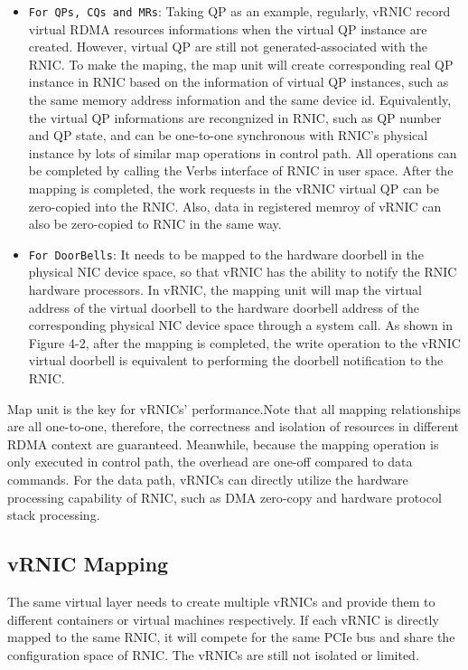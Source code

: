 \documentclass[sigplan,screen]{acmart}
\begin{document}
\begin{itemize}
\item {\verb|For QPs, CQs and MRs|}: Taking QP as an example, regularly, vRNIC record virtual RDMA resources informations when the virtual QP instance are created. However, virtual QP are still not generated-associated with the RNIC. To make the maping, the map unit will create corresponding real QP instance in RNIC based on the information of virtual QP instances, such as the same memory address information and the same device id. Equivalently, the virtual QP informations are recongnized in RNIC, such as QP number and QP state, and can be one-to-one synchronous with RNIC's  physical instance by lots of similar map operations in control path. All operations can be completed by calling the Verbs interface of RNIC in user space. After the mapping is completed, the work requests in the vRNIC virtual QP can be zero-copied into the RNIC. Also, data in registered memroy of vRNIC can also be zero-copied to RNIC in the same way. 
\item {\verb|For DoorBells|}: It needs to be mapped to the hardware doorbell in the physical NIC device space, so that vRNIC has the ability to notify the RNIC hardware processors. In vRNIC, the mapping unit will map the virtual address of the virtual doorbell to the hardware doorbell address of the corresponding physical NIC device space through a system call. As shown in Figure 4-2, after the mapping is completed, the write operation to the vRNIC virtual doorbell is equivalent to performing the doorbell notification to the RNIC.
\end{itemize}

Map unit is the key for vRNICs' performance.Note that all mapping relationships are all one-to-one, therefore, the correctness and isolation of resources in different RDMA context are guaranteed. Meanwhile, because the mapping operation is only executed in control path, the overhead are one-off compared to data commands. For the data path, vRNICs can directly utilize the hardware processing capability of RNIC, such as DMA zero-copy and hardware protocol stack processing.

\subsection{vRNIC Mapping}
The same virtual layer needs to create multiple vRNICs and provide them to different containers or virtual machines respectively. If each vRNIC is directly mapped to the same RNIC, it will compete for the same PCIe bus and share the configuration space of RNIC. The vRNICs are still not isolated or limited.
\end{document}
